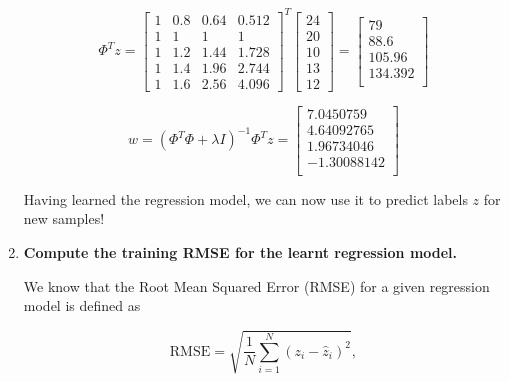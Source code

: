 \documentclass[12pt]{article}
\begin{document}
\begin{enumerate}[leftmargin=\labelsep]
        \begin{equation*}
          \Phi^T z = \begin{bmatrix}
            1 & 0.8 & 0.64 & 0.512 \\
            1 & 1   & 1    & 1     \\
            1 & 1.2 & 1.44 & 1.728 \\
            1 & 1.4 & 1.96 & 2.744 \\
            1 & 1.6 & 2.56 & 4.096
          \end{bmatrix}^T
          \begin{bmatrix}
            24 \\
            20 \\
            10 \\
            13 \\
            12
          \end{bmatrix} = \begin{bmatrix}
            79      \\
            88.6    \\
            105.96  \\
            134.392 \\
          \end{bmatrix}
        \end{equation*}

        \begin{equation*}
          w = (\Phi^T \Phi + \lambda I)^{-1} \Phi^T z = \begin{bmatrix}
            7.0450759   \\
            4.64092765  \\
            1.96734046  \\
            -1.30088142 \\
          \end{bmatrix}
        \end{equation*}

        Having learned the regression model, we can now use it to predict labels $z$
        for new samples!

        \pagebreak

  \item \textbf{Compute the training RMSE for the learnt regression model.}

        We know that the Root Mean Squared Error (RMSE) for a given regression model is
        defined as

        \begin{equation*}
          \text{RMSE} = \sqrt{\frac{1}{N} \sum_{i=1}^N (z_i - \hat{z}_i)^2},
        \end{equation*}


\end{enumerate}
\end{document}
